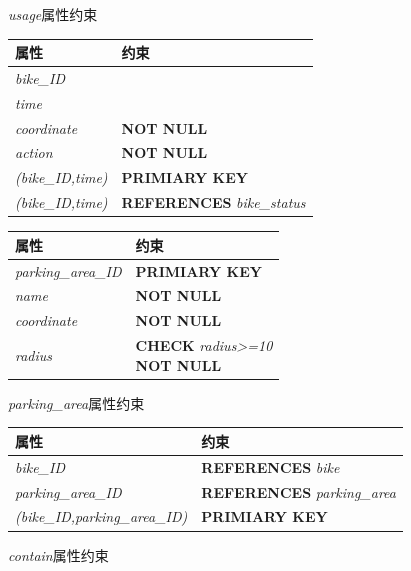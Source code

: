 \begin{figure}[!htp]
    \begin{minipage}{0.5\textwidth}
      \centering
      \caption{\textit{usage}属性约束}
      \label{contraint:usage}
      \begin{tabular}{ll}\toprule
        属性&约束\\\midrule
       \textit{bike\_ID}&\\
       \textit{time}&\\
       \textit{coordinate}&\textbf{NOT NULL}\\
       \textit{action}&\textbf{NOT NULL}\\
       \textit{(bike\_ID,time)}&\textbf{PRIMIARY KEY}\\
       \textit{(bike\_ID,time)}&\textbf{REFERENCES} \textit{bike\_status}\\
       \bottomrule
      \end{tabular}
    \end{minipage}\hfill
    \begin{minipage}{0.5\textwidth}
      \centering
      \caption{\textit{parking\_area}属性约束}
      \label{contraint:parkingarea}
      \begin{tabular}{ll}\toprule
        属性&约束\\\midrule
       \textit{parking\_area\_ID}&\textbf{PRIMIARY KEY}\\
       \textit{name}&\textbf{NOT NULL}\\
       \textit{coordinate}&\textbf{NOT NULL}\\
       \textit{radius}&\makecell[l]{\textbf{CHECK} \textit{radius>=10}\\\textbf{NOT NULL}}\\
       \bottomrule
      \end{tabular}
    \end{minipage}\hfill
 \end{figure}


\begin{figure}[!htp]
      \centering
      \caption{\textit{contain}属性约束}
      \label{contraint:contain}
      \begin{tabular}{ll}\toprule
        属性&约束\\\midrule
       \textit{bike\_ID}&\textbf{REFERENCES} \textit{bike}\\
       \textit{parking\_area\_ID}&\textbf{REFERENCES} \textit{parking\_area}\\
       \textit{(bike\_ID,parking\_area\_ID)}&\textbf{PRIMIARY KEY}\\
       \bottomrule
      \end{tabular}
\end{figure}

